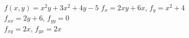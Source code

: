 {$f(x,y) = x^2y+3x^2+4y-5$
}
{$f_x=2xy+6x$, $f_y=x^2+4$\\
$f_{xx}=2y+6$, $f_{yy}=0$\\
$f_{xy}=2x$, $f_{yx}=2x$\\
}